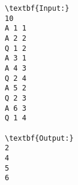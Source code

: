 \begin{verbatim}
\textbf{Input:}
10
A 1 1
A 2 2
Q 1 2
A 3 1
A 4 3
Q 2 4
A 5 2
Q 2 3
A 6 3
Q 1 4

\textbf{Output:}
2
4
5
6
\end{verbatim}
